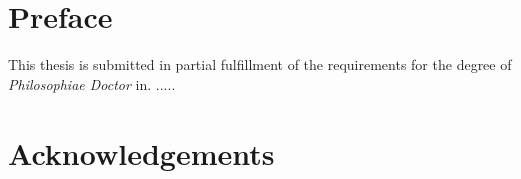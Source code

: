 \chapter{Preface}
This thesis is submitted in partial fulfillment of the requirements for the degree of \emph{Philosophiae Doctor} in. ..... 

\chapter*{Acknowledgements}
\kant[1-2]